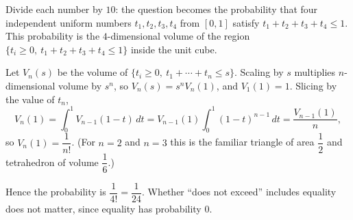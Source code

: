 Divide each number by $10$: the question becomes the probability that four independent uniform numbers $t_1,t_2,t_3,t_4$ from $[0,1]$ satisfy $t_1+t_2+t_3+t_4\le1$. This probability is the $4$-dimensional volume of the region $\{t_i\ge0,\ t_1+t_2+t_3+t_4\le1\}$ inside the unit cube.

Let $V_n(s)$ be the volume of $\{t_i\ge0,\ t_1+\cdots+t_n\le s\}$. Scaling by $s$ multiplies $n$-dimensional volume by $s^n$, so $V_n(s)=s^nV_n(1)$, and $V_1(1)=1$. Slicing by the value of $t_n$,
\[
V_n(1)=\int_0^1V_{n-1}(1-t)\,dt=V_{n-1}(1)\int_0^1(1-t)^{n-1}\,dt=\dfrac{V_{n-1}(1)}{n},
\]
so $V_n(1)=\dfrac{1}{n!}$. (For $n=2$ and $n=3$ this is the familiar triangle of area $\dfrac{1}{2}$ and tetrahedron of volume $\dfrac{1}{6}$.)

Hence the probability is $\dfrac{1}{4!}=\boxed{\dfrac{1}{24}}$. Whether ``does not exceed'' includes equality does not matter, since equality has probability $0$.
